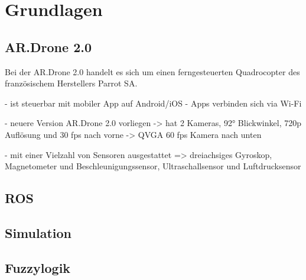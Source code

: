 \chapter{Grundlagen}
\label{cha:Fundamentals}

\section{AR.Drone 2.0}

Bei der AR.Drone 2.0 handelt es sich um einen ferngesteuerten Quadrocopter des französischem Herstellers Parrot SA. \cite{drone}
 
- ist steuerbar mit mobiler App auf Android/iOS
- Apps verbinden sich via Wi-Fi

- neuere Version AR.Drone 2.0 vorliegen
-> hat 2 Kameras, 92° Blickwinkel, 720p Auflösung und 30 fps nach vorne
-> QVGA 60 fps Kamera nach unten

- mit einer Vielzahl von Sensoren ausgestattet => dreiachsiges Gyroskop, Magnetometer und Beschleunigungssensor, Ultraschallsensor und Luftdrucksensor

 


\section{ROS}


\section{Simulation}

\section{Fuzzylogik}


